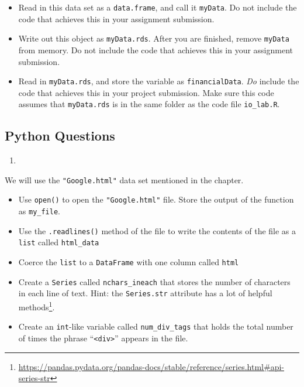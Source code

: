 \documentclass[
  12pt,
  krantz2]{krantz}
\providecommand{\tightlist}{%
  \setlength{\itemsep}{0pt}\setlength{\parskip}{0pt}}
\renewcommand{\href}[2]{#2\footnote{\url{#1}}}
\begin{document}
\begin{itemize}
\tightlist
\item
  Read in this data set as a \texttt{data.frame}, and call it \texttt{myData}. Do not include the code that achieves this in your assignment submission.
\item
  Write out this object as \texttt{myData.rds}. After you are finished, remove \texttt{myData} from memory. Do not include the code that achieves this in your assignment submission.
\item
  Read in \texttt{myData.rds}, and store the variable as \texttt{financialData}. \emph{Do} include the code that achieves this in your project submission. Make sure this code assumes that \texttt{myData.rds} is in the same folder as the code file \texttt{io\_lab.R}.
\end{itemize}

\hypertarget{python-questions-7}{%
\subsection{Python Questions}\label{python-questions-7}}

\begin{enumerate}
\def\labelenumi{\arabic{enumi}.}
\tightlist
\item
\end{enumerate}

We will use the \texttt{"Google.html"} data set mentioned in the chapter.

\begin{itemize}
\tightlist
\item
  Use \texttt{open()} to open the \texttt{"Google.html"} file. Store the output of the function as \texttt{my\_file}.
\item
  Use the \texttt{.readlines()} method of the file to write the contents of the file as a \texttt{list} called \texttt{html\_data}
\item
  Coerce the \texttt{list} to a \texttt{DataFrame} with one column called \texttt{html}
\item
  Create a \texttt{Series} called \texttt{nchars\_ineach} that stores the number of characters in each line of text. Hint: the \href{https://pandas.pydata.org/pandas-docs/stable/reference/series.html\#api-series-str}{\texttt{Series.str} attribute has a lot of helpful methods}.
\item
  Create an \texttt{int}-like variable called \texttt{num\_div\_tags} that holds the total number of times the phrase ``\texttt{\textless{}div\textgreater{}}'' appears in the file.
\end{itemize}
\end{document}
